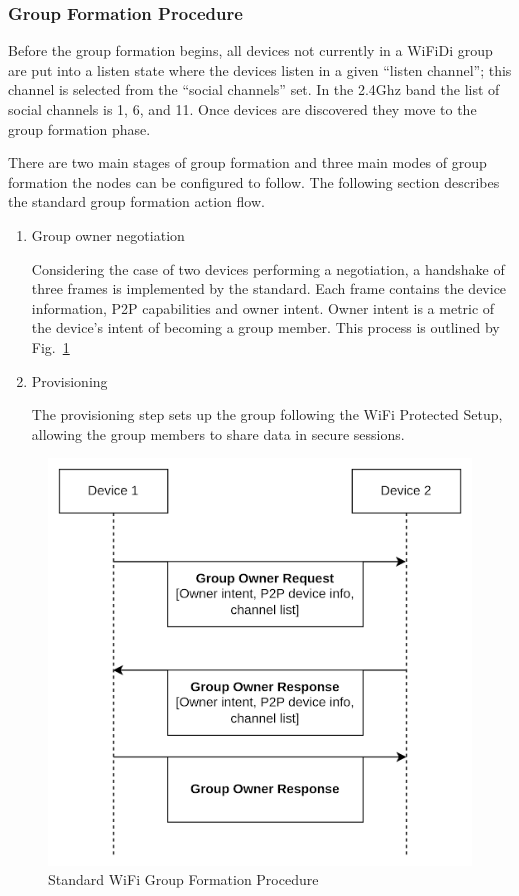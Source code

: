 \documentclass[12pt, conference, onecolumn, a4paper]{IEEEtran}
\begin{document}
\subsubsection{Group Formation Procedure}

Before the group formation begins, all devices not currently in a WiFiDi group
are put into a listen state where the devices listen in a given “listen
channel”; this channel is selected from the “social channels” set. In the
2.4Ghz band the list of social channels is 1, 6, and 11\cite{wifidispec}. Once
devices are discovered they move to the group formation phase.

There are two main stages of group formation and three main modes of group
formation the nodes can be configured to follow. The following section
describes the standard group formation action flow.

\begin{enumerate}
    \item Group owner negotiation

          Considering the case of two devices performing a negotiation, a
          handshake of three frames is implemented by the standard. Each frame
          contains
          the device information, P2P capabilities and owner
          intent\cite{wifidispec}.
          Owner intent is a metric of the device’s intent of becoming a group
          member. This process is outlined by Fig.~\ref{formproc}

    \item Provisioning

          The provisioning step sets up the group following the WiFi Protected
          Setup\cite{wifidispec}, allowing the group members to share data in
          secure
          sessions.

\end{enumerate}

\begin{figure}[htbp]
    \centerline{\includegraphics[height=0.45\textwidth]{imgs/formproc.png}}
    \caption{Standard WiFi Group Formation Procedure}
    \label{formproc}
\end{figure}
\end{document}
